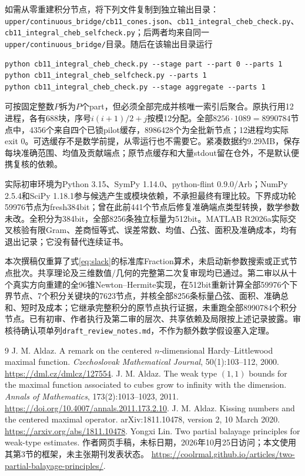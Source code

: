 \documentclass[UTF8,11pt,a4paper,fontset=fandol]{ctexart}
\theoremstyle{definition}\newtheorem{definition}[theorem]{定义}
\theoremstyle{remark}\newtheorem{remark}[theorem]{注}
\newcommand{\src}[1]{\nolinkurl{#1}}
\begin{document}
如需从零重建积分节点，将下列文件复制到独立输出目录：\src{upper/continuous_bridge/cb11_cones.json}、\src{cb11_integral_cheb_check.py}、\src{cb11_integral_cheb_selfcheck.py}；后两者均来自同一\src{upper/continuous_bridge/}目录。随后在该输出目录运行
\begin{verbatim}
python cb11_integral_cheb_check.py --stage part --part 0 --parts 1
python cb11_integral_cheb_selfcheck.py --parts 1
python cb11_integral_cheb_check.py --stage aggregate --parts 1
\end{verbatim}
可按固定整数$P$拆为$P$个part，但必须全部完成并核唯一索引后聚合。原执行用12进程，各有688块，序号$i(i+1)/2+j$按模12分配。全部$8256\cdot1089=8990784$节点中，4356个来自四个已锁pilot缓存，8986428个为全批新节点；12进程均实际exit $0$。可选缓存不是数学前提，从零运行也不需要它。紧凑数据约9.29MB，保存每块准确范围、均值及贡献端点；原节点缓存和大量stdout留在仓外，不是默认便携复核的依赖。

实际初审环境为Python 3.15、SymPy 1.14.0、python-flint 0.9.0/Arb；NumPy 2.5.4和SciPy 1.18.1参与候选产生或模块依赖，不承担最终有理比较。下界成功轮59976节点为fresh384bit；曾在此前441个节点后修复准确端点类型转换，数学参数未改。全积分为384bit，全部8256条独立标量为512bit。MATLAB R2026a实际交叉核验有限Gram、差商恒等式、误差常数、均值、凸弦、面积及准确成本，均有退出记录；它没有替代连续证书。

本次撰稿仅重算了式\eqref{eq:slack}的标准库Fraction算术，未启动新参数搜索或正式节点批次。共享理论及三维数值/几何的完整第二次复审现均已通过。第二审以从十个真实方向重建的全96锥Newton--Hermite实现，在512bit重新计算全部59976个下界节点、7个积分关键块的7623节点，并核全部8256条标量凸弦、面积、准确总和、短时及成本；它继承完整积分的原节点执行证据，未重跑全部8990784个积分节点。已有初审、作者执行及第二审的层次、共享依赖及局限按上述记录披露。审核待确认项单列\src{draft_review_notes.md}，不作为额外数学假设塞入定理。

\begin{thebibliography}{9}
 J. M. Aldaz.
A remark on the centered $n$-dimensional Hardy--Littlewood maximal function.
\emph{Czechoslovak Mathematical Journal}, 50(1):103--112, 2000.
\url{https://dml.cz/dmlcz/127554}.
 J. M. Aldaz.
The weak type $(1,1)$ bounds for the maximal function associated to cubes grow to infinity with the dimension.
\emph{Annals of Mathematics}, 173(2):1013--1023, 2011.
\url{https://doi.org/10.4007/annals.2011.173.2.10}.
 J. M. Aldaz.
Kissing numbers and the centered maximal operator.
arXiv:1811.10478, version 2, 10 March 2020.
\url{https://arxiv.org/abs/1811.10478}.
 Yongxi Lin.
Two partial balayage principles for weak-type estimates.
作者网页手稿，未标日期，2026年10月25日访问；本文使用其第3节的框架，未主张期刊发表状态。
\url{https://coolrmal.github.io/articles/two-partial-balayage-principles/}.
\end{thebibliography}
\end{document}
